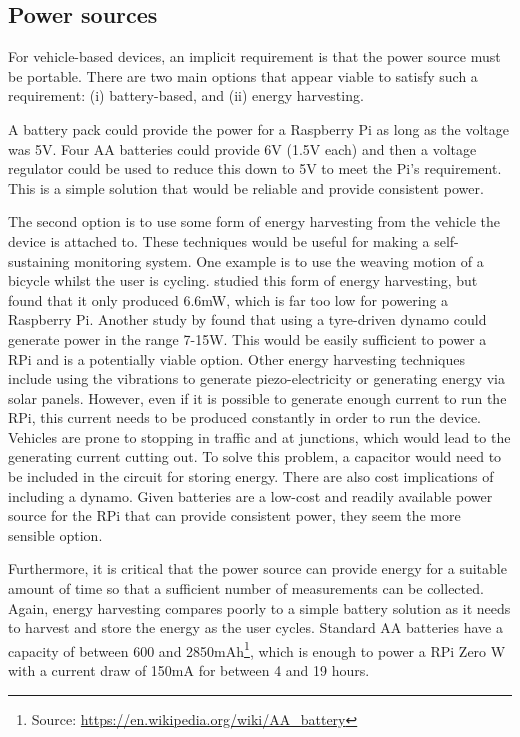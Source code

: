\documentclass[11pt,twosided,a4paper]{report}
\begin{document}
\subsection{Power sources}

For vehicle-based devices, an implicit requirement is that the power source must be portable. There are two main options that appear viable to satisfy such a requirement: (i) battery-based, and (ii) energy harvesting.

A battery pack could provide the power for a Raspberry Pi as long as the voltage was 5V. Four AA batteries could provide 6V (1.5V each) and then a voltage regulator could be used to reduce this down to 5V to meet the Pi's requirement. This is a simple solution that would be reliable and provide consistent power.

The second option is to use some form of energy harvesting from the vehicle the device is attached to. These techniques would be useful for making a self-sustaining monitoring system. One example is to use the weaving motion of a bicycle whilst the user is cycling. \cite{Yang2012weaving} studied this form of energy harvesting, but found that it only produced 6.6mW, which is far too low for powering a Raspberry Pi. Another study by \cite{hui2011energyharvestingbicycle} found that using a tyre-driven dynamo could generate power in the range 7-15W. This would be easily sufficient to power a RPi and is a potentially viable option. Other energy harvesting techniques include using the vibrations to generate piezo-electricity or generating energy via solar panels. However, even if it is possible to generate enough current to run the RPi, this current needs to be produced constantly in order to run the device. Vehicles are prone to stopping in traffic and at junctions, which would lead to the generating current cutting out. To solve this problem, a capacitor would need to be included in the circuit for storing energy. There are also cost implications of including a dynamo. Given batteries are a low-cost and readily available power source for the RPi that can provide consistent power, they seem the more sensible option.


Furthermore, it is critical that the power source can provide energy for a suitable amount of time so that a sufficient number of measurements can be collected. Again, energy harvesting compares poorly to a simple battery solution as it needs to harvest and store the energy as the user cycles. Standard AA batteries have a capacity of between 600 and 2850mAh\footnote{Source: \href{https://en.wikipedia.org/wiki/AA_battery}{\url{https://en.wikipedia.org/wiki/AA_battery}}}, which is enough to power a RPi Zero W with a current draw of 150mA for between 4 and 19 hours.
\end{document}
